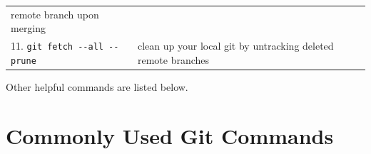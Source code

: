\documentclass[]{book}
\begin{document}
\begin{longtable}[]{@{}ll@{}}
\begin{minipage}[t]{0.13\columnwidth}
remote branch upon merging\strut
\end{minipage} & \begin{minipage}[t]{0.22\columnwidth}\raggedright\strut
\strut
\end{minipage}\tabularnewline
\begin{minipage}[t]{0.13\columnwidth}\raggedright\strut
11. \texttt{git\ fetch\ -\/-all\ -\/-prune}\strut
\end{minipage} & \begin{minipage}[t]{0.22\columnwidth}\raggedright\strut
clean up your local git by untracking deleted remote branches\strut
\end{minipage}\tabularnewline
\bottomrule
\end{longtable}

Other helpful commands are listed below.

\section{Commonly Used Git Commands}\label{commonly-used-git-commands}
\end{document}
